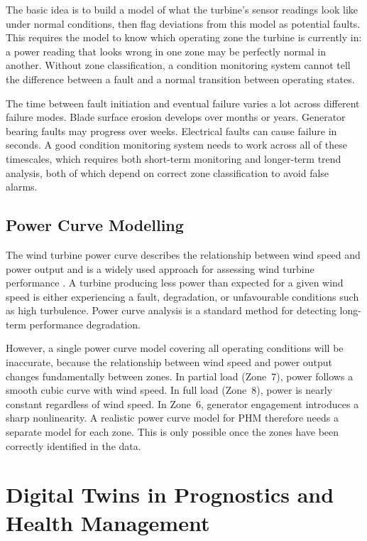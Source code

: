 The basic idea is to build a model of what the turbine's sensor readings look like under
normal conditions, then flag deviations from this model as potential faults. This
requires the model to know which operating zone the turbine is currently in: a power
reading that looks wrong in one zone may be perfectly normal in another. Without zone
classification, a condition monitoring system cannot tell the difference between a fault
and a normal transition between operating states.

The time between fault initiation and eventual failure varies a lot across different
failure modes. Blade surface erosion develops over months or years. Generator bearing
faults may progress over weeks. Electrical faults can cause failure in seconds. A good
condition monitoring system needs to work across all of these timescales, which requires
both short-term monitoring and longer-term trend analysis, both of which depend on
correct zone classification to avoid false alarms.

\subsection{Power Curve Modelling}
\label{subsec:bg:scada:powercurve}

The wind turbine power curve describes the relationship between wind speed and power
output and is a widely used approach for assessing wind turbine performance \citep{pandit2019}. A turbine producing less power than expected for a given wind speed
is either experiencing a fault, degradation, or unfavourable conditions such as high
turbulence. Power curve analysis is a standard method for detecting long-term performance
degradation.

However, a single power curve model covering all operating conditions will be inaccurate,
because the relationship between wind speed and power output changes fundamentally between
zones. In partial load (Zone~7), power follows a smooth cubic curve with wind speed. In
full load (Zone~8), power is nearly constant regardless of wind speed. In Zone~6,
generator engagement introduces a sharp nonlinearity. A realistic power curve model for
PHM therefore needs a separate model for each zone. This is only possible once the zones
have been correctly identified in the data.

\section{Digital Twins in Prognostics and Health Management}
\label{sec:bg:dt}

